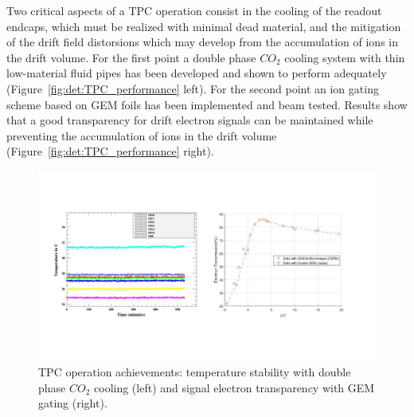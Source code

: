 \vspace{1cm}
Two critical aspects of a TPC operation consist in the cooling of the readout endcaps, which must be realized with minimal dead material, and the mitigation of the drift field distorsions which may develop from the accumulation of ions in the drift volume. For the first point a double phase $CO_2$ cooling system with thin low-material fluid pipes has been developed and shown to perform adequately (Figure~\ref{fig:det:TPC_performance} left). For the second point an ion gating scheme based on GEM foils has been implemented and beam tested. Results show that a good transparency for drift electron signals can be maintained while preventing the accumulation of ions in the drift volume (Figure~\ref{fig:det:TPC_performance} right).   

\begin{figure}[t!]
\centering
\includegraphics[width=1.0\hsize]{Detector/fig/TPC_operation.jpg}
\caption{TPC operation achievements: temperature stability with double phase $CO_2$ cooling (left) and signal electron transparency with GEM gating (right).} 
\label{fig:det:TPC_operation}
\end{figure}

\vspace{2cm}